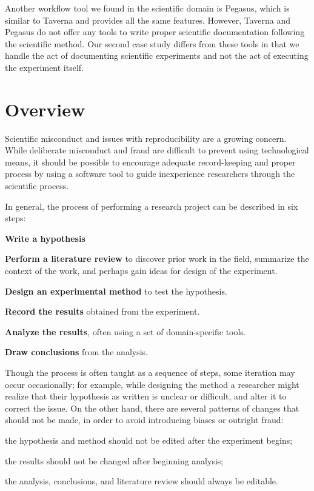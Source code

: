 \documentclass[document.tex]{subfiles}
\begin{document}
Another workflow tool we found in the scientific domain is Pegasus, which is similar to Taverna and provides all the same features. However, Taverna and Pegasus do not offer any tools to write proper scientific documentation following the scientific method. Our second case study differs from these tools in that we handle the act of documenting scientific experiments and not the act of executing the experiment itself.

\section {Overview}
\label{sec:case-study-research-overview}

Scientific misconduct and issues with reproducibility are a growing concern.
While deliberate misconduct and fraud are difficult to prevent using technological means, it should be possible to encourage adequate record-keeping and proper process by using a software tool to guide inexperience researchers through the scientific process.

In general, the process of performing a research project can be described in six steps:
\begin{compactenum}
\item \textbf{Write a hypothesis}
\item \textbf{Perform a literature review} to discover prior work in the field, summarize the context of the work, and perhaps gain ideas for design of the experiment.
\item \textbf{Design an experimental method} to test the hypothesis.
\item \textbf{Record the results} obtained from the experiment.
\item \textbf{Analyze the results}, often using a set of domain-specific tools.
\item \textbf{Draw conclusions} from the analysis.
\end{compactenum}

Though the process is often taught as a sequence of steps, some iteration may occur occasionally; for example, while designing the method a researcher might realize that their hypothesis as written is unclear or difficult, and alter it to correct the issue. On the other hand, there are several patterns of changes that should not be made, in order to avoid introducing biases or outright fraud:
\begin{compactitem}
\item the hypothesis and method should not be edited after the experiment begins;
\item the results should not be changed after beginning analysis;
\item the analysis, conclusions, and literature review should always be editable.
\end{compactitem}
\end{document}
